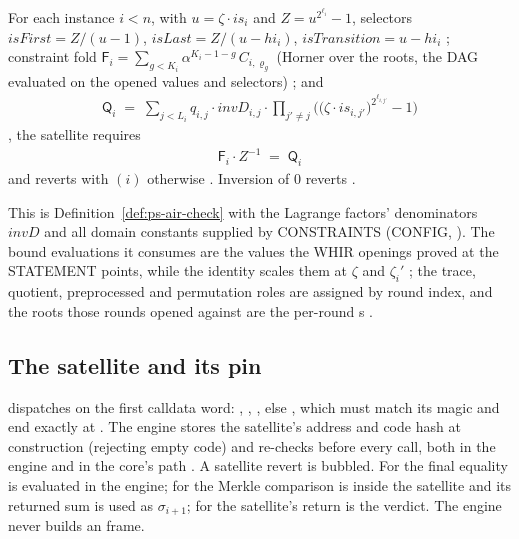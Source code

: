 \begin{property}
\label{prop:sv-cidnty}
For each instance $i<n$, with $u = \zeta\cdot \mathit{is}_i$ and
$Z = u^{2^{\ell_i}} - 1$, selectors $\mathit{isFirst} = Z/(u-1)$,
$\mathit{isLast} = Z/(u-\mathit{hi}_i)$, $\mathit{isTransition} = u - \mathit{hi}_i$
; constraint fold
$\mathsf F_i = \sum_{g<K_i}\alpha^{K_i-1-g}\, C_{i,\varrho_g}$ (Horner over the
roots, the DAG evaluated on the opened values and selectors)
; and
\begin{align}
  \mathsf Q_i \;=\; \sum_{j<L_i} q_{i,j}\cdot \mathit{invD}_{i,j}\cdot
  \prod_{j'\ne j}\Big(\big(\zeta\cdot \mathit{is}_{i,j'}\big)^{2^{\ell_{i,j'}}} - 1\Big)
\end{align}
, the satellite requires
\begin{align}
  \mathsf F_i \cdot Z^{-1} \;=\; \mathsf Q_i
\end{align}
and reverts with $(i)$ otherwise
. Inversion of $0$ reverts
.
\end{property}

This is Definition~\ref{def:ps-air-check} with the Lagrange factors' denominators
$\mathit{invD}$ and all domain constants supplied by CONSTRAINTS (CONFIG,
). The bound evaluations it consumes are the values the WHIR
openings proved at the STATEMENT points, while the identity scales them at $\zeta$
and $\zeta_i'$ ; the trace, quotient, preprocessed and permutation
roles are assigned by round index, and the roots those rounds opened against are
the per-round s .

\subsection{The satellite and its pin}
\label{subsec:sv-satellite}

 dispatches on the first calldata word: ,
, , else , which must match its magic and
end exactly at  . The engine
stores the satellite's address and code hash at construction (rejecting empty
code) and re-checks  before every call, both in the engine and in
the core's  path 
. A satellite revert is bubbled. For
 the final equality is evaluated in the engine; for  the
Merkle comparison is inside the satellite and its returned sum is used as
$\sigma_{i+1}$; for  the satellite's return is the verdict. The
engine never builds an  frame.

